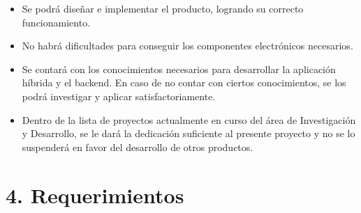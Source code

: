 \documentclass[
11pt, %
]{charter}
\begin{document}
\begin{itemize}
	\item Se podrá diseñar e implementar el producto, logrando su correcto funcionamiento.
	\item No habrá dificultades para conseguir los componentes electrónicos necesarios.
	\item Se contará con los conocimientos necesarios para desarrollar la aplicación híbrida y el backend. En caso de no contar con ciertos conocimientos, se los podrá investigar y aplicar satisfactoriamente.
	\item Dentro de la lista de proyectos actualmente en curso del área de Investigación y Desarrollo, se le dará la dedicación suficiente al presente proyecto y no se lo suspenderá en favor del desarrollo de otros productos.
\end{itemize}


\section{4. Requerimientos}
\label{sec:requerimientos}

\end{document}
